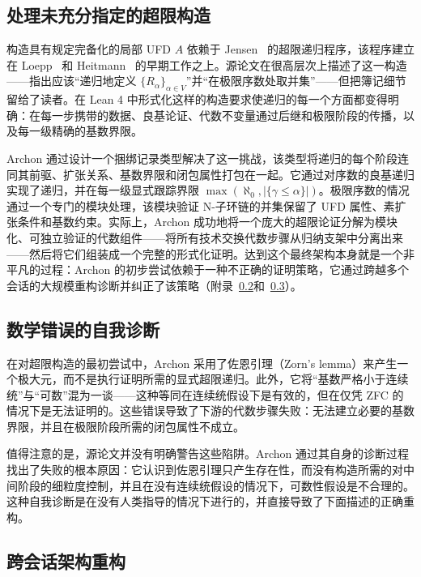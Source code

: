 \subsection{处理未充分指定的超限构造}\label{subsubsec:transfinite}

构造具有规定完备化的局部 UFD $A$ 依赖于 Jensen~\cite{jensen2006completions} 的超限递归程序，该程序建立在 Loepp~\cite{loepp1997constructing} 和 Heitmann~\cite{heitmann1993characterization} 的早期工作之上。源论文在很高层次上描述了这一构造——指出应该“递归地定义 $\{R_\alpha\}_{\alpha \in V}$”并“在极限序数处取并集”——但把簿记细节留给了读者。在 Lean 4 中形式化这样的构造要求使递归的每一个方面都变得明确：在每一步携带的数据、良基论证、代数不变量通过后继和极限阶段的传播，以及每一级精确的基数界限。

Archon 通过设计一个捆绑记录类型解决了这一挑战，该类型将递归的每个阶段连同其前驱、扩张关系、基数界限和闭包属性打包在一起。它通过对序数的良基递归实现了递归，并在每一级显式跟踪界限 $\max(\aleph_0, |\{\gamma \le \alpha\}|)$。极限序数的情况通过一个专门的模块处理，该模块验证 N-子环链的并集保留了 UFD 属性、素扩张条件和基数约束。实际上，Archon 成功地将一个庞大的超限论证分解为模块化、可独立验证的代数组件——将所有技术交换代数步骤从归纳支架中分离出来——然后将它们组装成一个完整的形式化证明。达到这个最终架构本身就是一个非平凡的过程：Archon 的初步尝试依赖于一种不正确的证明策略，它通过跨越多个会话的大规模重构诊断并纠正了该策略（附录~\ref{subsubsec:self-diagnosis}和~\ref{subsubsec:refactoring}）。

\subsection{数学错误的自我诊断}\label{subsubsec:self-diagnosis}

在对超限构造的最初尝试中，Archon 采用了佐恩引理（Zorn's lemma）来产生一个极大元，而不是执行证明所需的显式超限递归。此外，它将“基数严格小于连续统”与“可数”混为一谈——这种等同在连续统假设下是有效的，但在仅凭 ZFC 的情况下是无法证明的。这些错误导致了下游的代数步骤失败：无法建立必要的基数界限，并且在极限阶段所需的闭包属性不成立。

值得注意的是，源论文并没有明确警告这些陷阱。Archon 通过其自身的诊断过程找出了失败的根本原因：它认识到佐恩引理只产生存在性，而没有构造所需的对中间阶段的细粒度控制，并且在没有连续统假设的情况下，可数性假设是不合理的。这种自我诊断是在没有人类指导的情况下进行的，并直接导致了下面描述的正确重构。

\subsection{跨会话架构重构}\label{subsubsec:refactoring}

